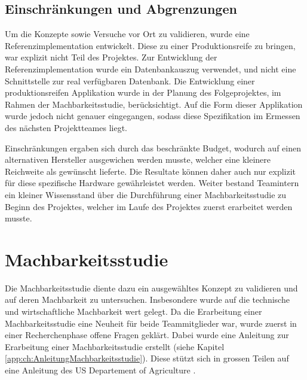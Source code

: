 \subsection{Einschränkungen und Abgrenzungen}
Um die Konzepte sowie Versuche vor Ort zu validieren, wurde eine Referenzimplementation entwickelt. Diese zu einer Produktionsreife zu bringen, war explizit nicht Teil des Projektes. Zur Entwicklung der Referenzimplementation wurde ein Datenbankauszug verwendet, und nicht eine Schnittstelle zur real verfügbaren Datenbank. Die Entwicklung einer produktionsreifen Applikation wurde in der Planung des Folgeprojektes, im Rahmen der Machbarkeitsstudie, berücksichtigt. Auf die Form dieser Applikation wurde jedoch nicht genauer eingegangen, sodass diese Spezifikation im Ermessen des nächsten Projektteames liegt.

Einschränkungen ergaben sich durch das beschränkte Budget, wodurch auf einen alternativen Hersteller ausgewichen werden musste, welcher eine kleinere Reichweite als gewünscht lieferte. Die Resultate können daher auch nur explizit für diese spezifische Hardware gewährleistet werden.
Weiter bestand Teamintern ein kleiner Wissensstand über die Durchführung einer Machbarkeitsstudie zu Beginn des Projektes, welcher im Laufe des Projektes zuerst erarbeitet werden musste.

\section{Machbarkeitsstudie}
Die Machbarkeitsstudie diente dazu ein ausgewähltes Konzept zu validieren und auf deren Machbarkeit zu untersuchen. Insbesondere wurde auf die technische und wirtschaftliche Machbarkeit wert gelegt. Da die Erarbeitung einer Machbarkeitsstudie eine Neuheit für beide Teammitglieder war, wurde zuerst in einer Recherchenphase offene Fragen geklärt. Dabei wurde eine Anleitung zur Erarbeitung einer Machbarkeitsstudie erstellt (siehe Kapitel \ref{app:ch:AnleitungMachbarkeitsstudie}). Diese stützt sich in grossen Teilen auf eine Anleitung des US Departement of Agriculture \parencite{Matson2000}.
